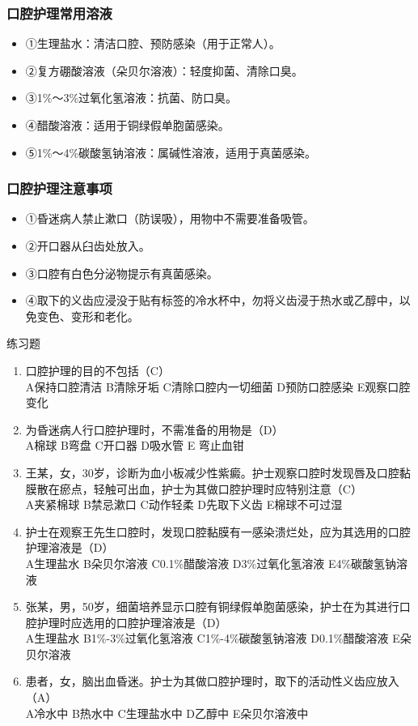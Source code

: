 \documentclass[11pt, a4paper]{ctexart}
\begin{document}
\subsubsection{口腔护理常用溶液}
\begin{itemize}
    \item ①生理盐水：清洁口腔、预防感染（用于正常人）。
    \item ②复方硼酸溶液（朵贝尔溶液）：轻度抑菌、清除口臭。
    \item ③1\%～3\%过氧化氢溶液：抗菌、防口臭。
    \item ④醋酸溶液：适用于铜绿假单胞菌感染。
    \item ⑤1\%～4\%碳酸氢钠溶液：属碱性溶液，适用于真菌感染。
\end{itemize}

\subsubsection{口腔护理注意事项}
\begin{itemize}
    \item ①昏迷病人禁止漱口（防误吸），用物中不需要准备吸管。
    \item ②开口器从臼齿处放入。
    \item ③口腔有白色分泌物提示有真菌感染。
    \item ④取下的义齿应浸没于贴有标签的冷水杯中，勿将义齿浸于热水或乙醇中，以免变色、变形和老化。
\end{itemize}

\begin{examplebox}{练习题}
\begin{enumerate}
    \item 口腔护理的目的不包括（C）\\
    A保持口腔清洁 \quad B清除牙垢 \quad C清除口腔内一切细菌 \quad D预防口腔感染 \quad E观察口腔变化
    \item 为昏迷病人行口腔护理时，不需准备的用物是（D）\\
    A棉球 \quad B弯盘 \quad C开口器 \quad D吸水管 \quad E 弯止血钳
    \item 王某，女，30岁，诊断为血小板减少性紫癜。护士观察口腔时发现唇及口腔黏膜散在瘀点，轻触可出血，护士为其做口腔护理时应特别注意（C）\\
    A夹紧棉球 \quad B禁忌漱口 \quad C动作轻柔 \quad D先取下义齿 \quad E棉球不可过湿
    \item 护士在观察王先生口腔时，发现口腔黏膜有一感染溃烂处，应为其选用的口腔护理溶液是（D）\\
    A生理盐水 \quad B朵贝尔溶液 \quad C0.1\%醋酸溶液 \quad D3\%过氧化氢溶液 \quad E4\%碳酸氢钠溶液
    \item 张某，男，50岁，细菌培养显示口腔有铜绿假单胞菌感染，护士在为其进行口腔护理时应选用的口腔护理溶液是（D）\\
    A生理盐水 \quad B1\%-3\%过氧化氢溶液 \quad C1\%-4\%碳酸氢钠溶液 \quad D0.1\%醋酸溶液 \quad E朵贝尔溶液
    \item 患者，女，脑出血昏迷。护士为其做口腔护理时，取下的活动性义齿应放入（A）\\
    A冷水中 \quad B热水中 \quad C生理盐水中 \quad D乙醇中 \quad E朵贝尔溶液中
\end{enumerate}
\end{examplebox}
\end{document}
